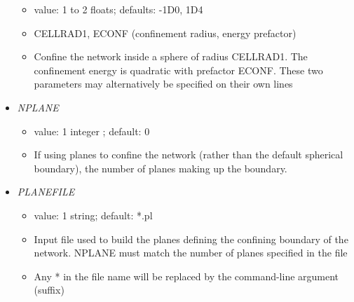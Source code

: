 \documentclass[12pt]{article}
\begin{document}
\begin{itemize}
    \begin{itemize}
      \item  value: 1 to 2 floats; defaults: -1D0, 1D4
      \item CELLRAD1, ECONF (confinement radius, energy prefactor)
      \item Confine the network inside a sphere of radius CELLRAD1. The confinement energy is quadratic with prefactor ECONF. These two parameters may alternatively be specified on their own lines
\end{itemize}
%
\item {\it NPLANE}
  \begin{itemize}
    \item  value: 1 integer ; default: $0$
    \item If using planes to confine the network (rather than the default spherical boundary), the number of planes making up the boundary.
  \end{itemize}
%
\item {\it PLANEFILE}
  \begin{itemize}
    \item  value: 1 string; default: *.pl
    \item Input file used to build the planes defining the confining boundary of the network. NPLANE must match the number of planes specified in the file
    \item Any * in the file name will be replaced by the command-line argument (suffix)
  \end{itemize}
\end{itemize}
\end{document}
